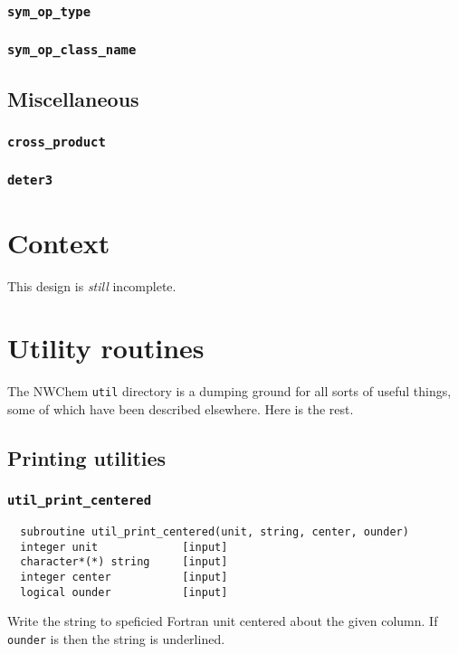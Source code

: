 \subsubsection{{\tt sym\_op\_type}}

\subsubsection{{\tt sym\_op\_class\_name}}

\subsection{Miscellaneous}

\subsubsection{{\tt cross\_product}}

\subsubsection{{\tt deter3}}


\section{Context}

This design is {\em still} incomplete.


\section{Utility routines}

The NWChem {\tt util} directory is a dumping ground for all sorts of useful
things, some of which have been described elsewhere.  Here is the rest.

\subsection{Printing utilities}

\subsubsection{{\tt util\_print\_centered}}
\begin{verbatim}
  subroutine util_print_centered(unit, string, center, ounder)
  integer unit             [input]
  character*(*) string     [input]
  integer center           [input]
  logical ounder           [input]
\end{verbatim}
Write the string to speficied Fortran unit centered about the given
column.  If {\tt ounder} is \TRUE then the string is underlined.

